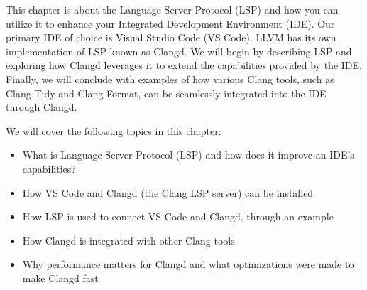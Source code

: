 This chapter is about the Language Server Protocol (LSP) and how you can utilize it to enhance your Integrated Development Environment (IDE). Our primary IDE of choice is Visual Studio Code (VS Code). LLVM has its own implementation of LSP known as Clangd. We will begin by describing LSP and exploring how Clangd leverages it to extend the capabilities provided by the IDE. Finally, we will conclude with examples of how various Clang tools, such as Clang-Tidy and Clang-Format, can be seamlessly integrated into the IDE through Clangd.

We will cover the following topics in this chapter:

\begin{itemize}
\item
What is Language Server Protocol (LSP) and how does it improve an IDE’s capabilities?

\item
How VS Code and Clangd (the Clang LSP server) can be installed

\item
How LSP is used to connect VS Code and Clangd, through an example

\item
How Clangd is integrated with other Clang tools

\item
Why performance matters for Clangd and what optimizations were made to make Clangd fast
\end{itemize}